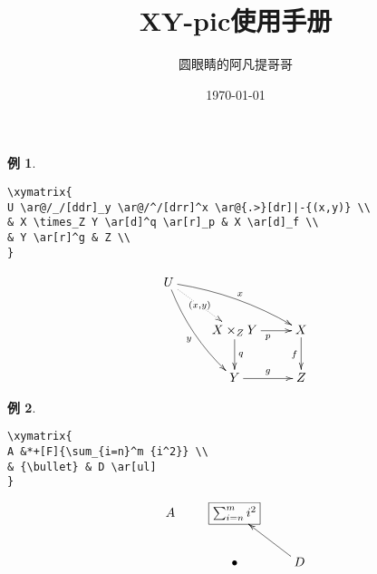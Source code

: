 \documentclass[openany]{ctexart}
\theoremstyle{definition}
\newtheorem{exam}{例}
\begin{document}
\title{\textbf{XY-pic使用手册}}
\author{圆眼睛的阿凡提哥哥}
\date{\today}
\maketitle

\begin{exam}
\begin{lstlisting}
\xymatrix{
U \ar@/_/[ddr]_y \ar@/^/[drr]^x \ar@{.>}[dr]|-{(x,y)} \\
& X \times_Z Y \ar[d]^q \ar[r]_p & X \ar[d]_f \\
& Y \ar[r]^g & Z \\
}
\end{lstlisting}

\begin{align*}
\xymatrix{
U \ar@/_/[ddr]_y \ar@/^/[drr]^x \ar@{.>}[dr]|-{(x,y)} \\
& X \times_Z Y \ar[d]^q \ar[r]_p & X \ar[d]_f \\
& Y \ar[r]^g & Z \\
}
\end{align*}
\end{exam}


\begin{exam}
\begin{lstlisting}
\xymatrix{
A &*+[F]{\sum_{i=n}^m {i^2}} \\
& {\bullet} & D \ar[ul]
}
\end{lstlisting}

\begin{align*}
\xymatrix{
A & *+[F]{\sum_{i=n}^m {i^2}} \\
& {\bullet} & D \ar[ul]
}
\end{align*}
\end{exam}
\end{document}
